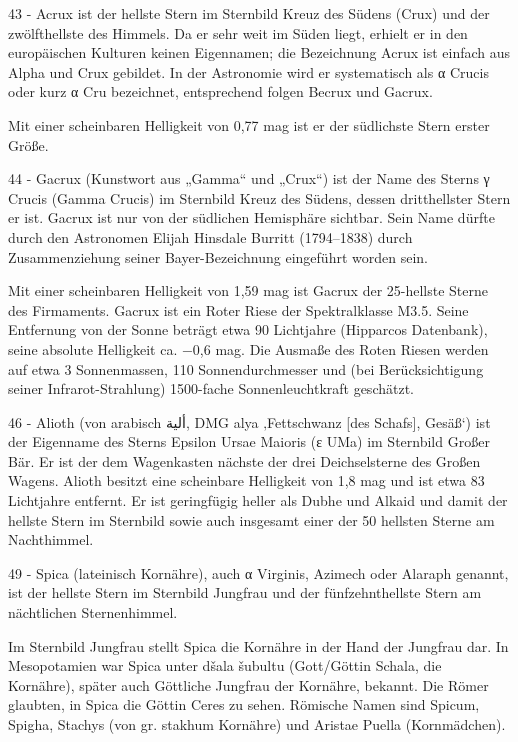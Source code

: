 43 - Acrux ist der hellste Stern im Sternbild Kreuz des Südens (Crux) und der zwölfthellste des Himmels. Da er sehr weit im Süden liegt, erhielt er in den europäischen Kulturen keinen Eigennamen; die Bezeichnung Acrux ist einfach aus Alpha und Crux gebildet. In der Astronomie wird er systematisch als α Crucis oder kurz α Cru bezeichnet, entsprechend folgen Becrux und Gacrux.

Mit einer scheinbaren Helligkeit von 0,77 mag ist er der südlichste Stern erster Größe. 


44 - Gacrux (Kunstwort aus „Gamma“ und „Crux“) ist der Name des Sterns γ Crucis (Gamma Crucis) im Sternbild Kreuz des Südens, dessen dritthellster Stern er ist. Gacrux ist nur von der südlichen Hemisphäre sichtbar. Sein Name dürfte durch den Astronomen Elijah Hinsdale Burritt (1794–1838) durch Zusammenziehung seiner Bayer-Bezeichnung eingeführt worden sein.

Mit einer scheinbaren Helligkeit von 1,59 mag ist Gacrux der 25-hellste Sterne des Firmaments. Gacrux ist ein Roter Riese der Spektralklasse M3.5. Seine Entfernung von der Sonne beträgt etwa 90 Lichtjahre (Hipparcos Datenbank), seine absolute Helligkeit ca. −0,6 mag. Die Ausmaße des Roten Riesen werden auf etwa 3 Sonnenmassen, 110 Sonnendurchmesser und (bei Berücksichtigung seiner Infrarot-Strahlung) 1500-fache Sonnenleuchtkraft geschätzt. 


46 - Alioth (von arabisch ألية, DMG alya ‚Fettschwanz [des Schafs], Gesäß‘) ist der Eigenname des Sterns Epsilon Ursae Maioris (ε UMa) im Sternbild Großer Bär. Er ist der dem Wagenkasten nächste der drei Deichselsterne des Großen Wagens. Alioth besitzt eine scheinbare Helligkeit von 1,8 mag und ist etwa 83 Lichtjahre entfernt. Er ist geringfügig heller als Dubhe und Alkaid und damit der hellste Stern im Sternbild sowie auch insgesamt einer der 50 hellsten Sterne am Nachthimmel. 



49 - Spica (lateinisch Kornähre), auch α Virginis, Azimech oder Alaraph genannt, ist der hellste Stern im Sternbild Jungfrau und der fünfzehnthellste Stern am nächtlichen Sternenhimmel.

Im Sternbild Jungfrau stellt Spica die Kornähre in der Hand der Jungfrau dar. In Mesopotamien war Spica unter dšala šubultu (Gott/Göttin Schala, die Kornähre), später auch Göttliche Jungfrau der Kornähre, bekannt. Die Römer glaubten, in Spica die Göttin Ceres zu sehen. Römische Namen sind Spicum, Spigha, Stachys (von gr. stakhum Kornähre) und Aristae Puella (Kornmädchen).

